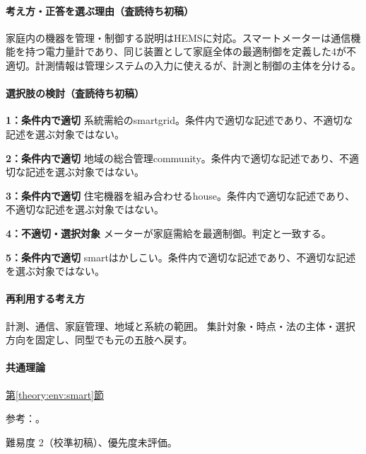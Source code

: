 \paragraph{考え方・正答を選ぶ理由（査読待ち初稿）} 家庭内の機器を管理・制御する説明はHEMSに対応。スマートメーターは通信機能を持つ電力量計であり、同じ装置として家庭全体の最適制御を定義した4が不適切。計測情報は管理システムの入力に使えるが、計測と制御の主体を分ける。

\paragraph{選択肢の検討（査読待ち初稿）}\mbox{}\par

\noindent\textbf{1：条件内で適切} 系統需給のsmartgrid。条件内で適切な記述であり、不適切な記述を選ぶ対象ではない。\par

\noindent\textbf{2：条件内で適切} 地域の総合管理community。条件内で適切な記述であり、不適切な記述を選ぶ対象ではない。\par

\noindent\textbf{3：条件内で適切} 住宅機器を組み合わせるhouse。条件内で適切な記述であり、不適切な記述を選ぶ対象ではない。\par

\noindent\textbf{4：不適切・選択対象} メーターが家庭需給を最適制御。判定と一致する。\par

\noindent\textbf{5：条件内で適切} smartはかしこい。条件内で適切な記述であり、不適切な記述を選ぶ対象ではない。\par

\paragraph{再利用する考え方} 計測、通信、家庭管理、地域と系統の範囲。 集計対象・時点・法の主体・選択方向を固定し、同型でも元の五肢へ戻す。

\paragraph{共通理論} \hyperref[theory:env:smart]{第\ref*{theory:env:smart}節}

\par 参考：\cite{env59_smart}。

\par 難易度 2（校準初稿）、優先度未評価。

